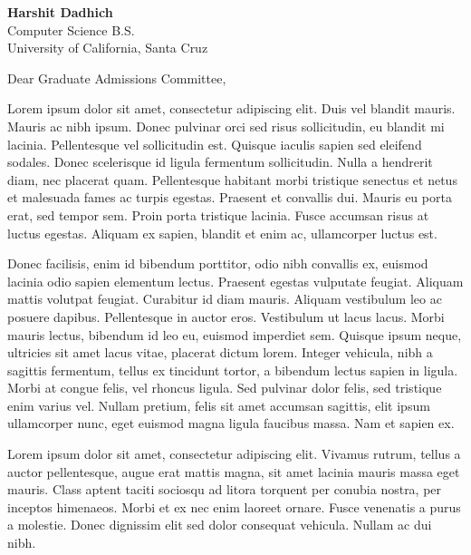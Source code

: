 \documentclass[11pt]{cicsletter}
\date{December 15, 2024\\Tracy, CA 95391}
\begin{document}
\begin{letter}{
        {\textbf{Harshit Dadhich}}\hfill \href{https://harshdadhich.com}{\color[HTML]{0000EE}{https://harshdadhich.com}}~\faGlobe\\
        Computer Science B.S.\hfill \href{mailto:hdadhich01@gmail.com}{\color[HTML]{0000EE}{hdadhich01@gmail.com}}~\faEnvelope\\
        University of California, Santa Cruz\hfill \href{tel:+12096371007}{\color[HTML]{0000EE}{+1 (209) 637-1007}}~\faPhone\\
    }
    \opening{Dear Graduate Admissions Committee,}

    \vspace{1em}

    Lorem ipsum dolor sit amet, consectetur adipiscing elit. Duis vel blandit mauris. Mauris ac nibh ipsum. Donec pulvinar orci sed risus sollicitudin, eu blandit mi lacinia. Pellentesque vel sollicitudin est. Quisque iaculis sapien sed eleifend sodales. Donec scelerisque id ligula fermentum sollicitudin. Nulla a hendrerit diam, nec placerat quam. Pellentesque habitant morbi tristique senectus et netus et malesuada fames ac turpis egestas. Praesent et convallis dui. Mauris eu porta erat, sed tempor sem. Proin porta tristique lacinia. Fusce accumsan risus at luctus egestas. Aliquam ex sapien, blandit et enim ac, ullamcorper luctus est.

    Donec facilisis, enim id bibendum porttitor, odio nibh convallis ex, euismod lacinia odio sapien elementum lectus. Praesent egestas vulputate feugiat. Aliquam mattis volutpat feugiat. Curabitur id diam mauris. Aliquam vestibulum leo ac posuere dapibus. Pellentesque in auctor eros. Vestibulum ut lacus lacus. Morbi mauris lectus, bibendum id leo eu, euismod imperdiet sem. Quisque ipsum neque, ultricies sit amet lacus vitae, placerat dictum lorem. Integer vehicula, nibh a sagittis fermentum, tellus ex tincidunt tortor, a bibendum lectus sapien in ligula. Morbi at congue felis, vel rhoncus ligula. Sed pulvinar dolor felis, sed tristique enim varius vel. Nullam pretium, felis sit amet accumsan sagittis, elit ipsum ullamcorper nunc, eget euismod magna ligula faucibus massa. Nam et sapien ex.

    Lorem ipsum dolor sit amet, consectetur adipiscing elit. Vivamus rutrum, tellus a auctor pellentesque, augue erat mattis magna, sit amet lacinia mauris massa eget mauris. Class aptent taciti sociosqu ad litora torquent per conubia nostra, per inceptos himenaeos. Morbi et ex nec enim laoreet ornare. Fusce venenatis a purus a molestie. Donec dignissim elit sed dolor consequat vehicula. Nullam ac dui nibh.


\end{letter}
\end{document}
